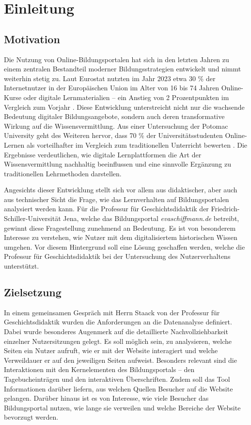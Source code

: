 \chapter{Einleitung}
\label{ch:einleitung}

\section{Motivation}
\label{sec:motivation}

Die Nutzung von Online-Bildungsportalen hat sich in den letzten Jahren zu einem zentralen Bestandteil moderner Bildungsstrategien entwickelt und nimmt weiterhin stetig zu. Laut Eurostat nutzten im Jahr 2023 etwa 30 \% der Internetnutzer in der Europäischen Union im Alter von 16 bis 74 Jahren Online-Kurse oder digitale Lernmaterialien – ein Anstieg von 2 Prozentpunkten im Vergleich zum Vorjahr \parencite{Eurostat}. Diese Entwicklung unterstreicht nicht nur die wachsende Bedeutung digitaler Bildungsangebote, sondern auch deren transformative Wirkung auf die Wissensvermittlung. Aus einer Untersuchung der Potomac University geht des Weiteren hervor, dass 70 \% der Universitätsstudenten Online-Lernen als vorteilhafter im Vergleich zum traditionellen Unterricht bewerten \parencite{Potomac}. Die Ergebnisse verdeutlichen, wie digitale Lernplattformen die Art der Wissensvermittlung nachhaltig beeinflussen und eine sinnvolle Ergänzung zu traditionellen Lehrmethoden darstellen.

Angesichts dieser Entwicklung stellt sich vor allem aus didaktischer, aber auch aus technischer Sicht die Frage, wie das Lernverhalten auf Bildungsportalen analysiert werden kann. Für die Professur für Geschichtsdidaktik der Friedrich-Schiller-Universität Jena, welche das Bildungsportal \textit{evaschiffmann.de} betreibt, gewinnt diese Fragestellung zunehmend an Bedeutung. Es ist von besonderem Interesse zu verstehen, wie Nutzer mit dem digitalisiertem historischen Wissen umgehen. Vor diesem Hintergrund soll eine Lösung geschaffen werden, welche die Professur für Geschichtsdidaktik bei der Untersuchung des Nutzerverhaltens unterstützt.

\section{Zielsetzung}
\label{sec:zielsetzung}

In einem gemeinsamen Gespräch mit Herrn Staack von der Professur für Geschichtsdidaktik wurden die Anforderungen an die Datenanalyse definiert. Dabei wurde besonderes Augenmerk auf die detaillierte Nachvollziehbarkeit einzelner Nutzersitzungen gelegt. Es soll möglich sein, zu analysieren, welche Seiten ein Nutzer aufruft, wie er mit der Website interagiert und welche Verweildauer er auf den jeweiligen Seiten aufweist. Besonders relevant sind die Interaktionen mit den Kernelementen des Bildungsportals – den Tagebucheinträgen und den interaktiven Überschriften. Zudem soll das Tool Informationen darüber liefern, aus welchen Quellen Besucher auf die Website gelangen. Darüber hinaus ist es von Interesse, wie viele Besucher das Bildungsportal nutzen, wie lange sie verweilen und welche Bereiche der Website bevorzugt werden.

